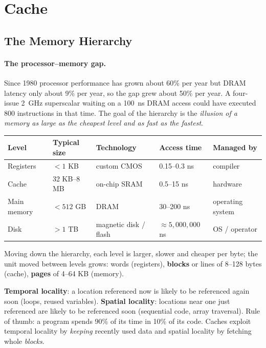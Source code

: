 \section{Cache}
\label{sec:cache}

\subsection{The Memory Hierarchy}
\label{sec:hierarchy}

\paragraph{The processor--memory gap.} Since 1980 processor performance has
grown about 60\% per year but DRAM latency only about 9\% per year, so the gap
grew about 50\% per year. A four-issue 2~GHz superscalar waiting on a 100~ns DRAM
access could have executed 800 instructions in that time. The goal of the
hierarchy is the \emph{illusion of a memory as large as the cheapest level and as
fast as the fastest}.

\begin{center}
\small
\begin{tabular}{@{}lllll@{}}
\toprule
Level & Typical size & Technology & Access time & Managed by \\
\midrule
Registers & $<1$ KB & custom CMOS & 0.15--0.3 ns & compiler \\
Cache & 32 KB--8 MB & on-chip SRAM & 0.5--15 ns & hardware \\
Main memory & $<512$ GB & DRAM & 30--200 ns & operating system \\
Disk & $>1$ TB & magnetic disk / flash & $\approx5{,}000{,}000$ ns & OS / operator \\
\bottomrule
\end{tabular}
\end{center}
Moving down the hierarchy, each level is larger, slower and cheaper per byte; the
unit moved between levels grows: words (registers), \textbf{blocks} or lines of
8--128 bytes (cache), \textbf{pages} of 4--64 KB (memory).

\begin{definition}[Locality]
\textbf{Temporal locality}: a location referenced now is likely to be referenced
again soon (loops, reused variables). \textbf{Spatial locality}: locations near
one just referenced are likely to be referenced soon (sequential code, array
traversal). Rule of thumb: a program spends 90\% of its time in 10\% of its
code. Caches exploit temporal locality by \emph{keeping} recently used data and
spatial locality by fetching whole \emph{blocks}.
\end{definition}

